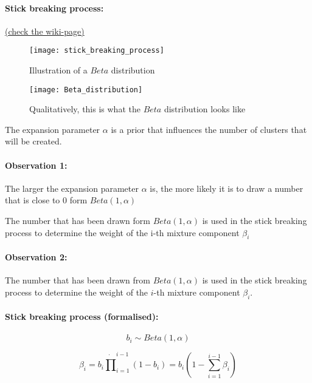 \paragraph{Stick breaking process:} \href{https://en.wikipedia.org/wiki/Dirichlet_process#The_stick-breaking_process}{(check the wiki-page)}
\begin{figure}[H]
  \centering
  \begin{minipage}[b]{0.49\textwidth}
    \texttt{[image: stick\_breaking\_process]}
    \caption{Illustration of a $Beta$ distribution}
  \end{minipage}
  \begin{minipage}[b]{0.49\textwidth}
    \texttt{[image: Beta\_distribution]}
    \caption{Qualitatively, this is what the $Beta$ distribution looks like}
  \end{minipage}
\end{figure}

The expansion parameter $\alpha$ is a prior that influences the number of clusters that will be created.

\paragraph{Observation 1:}
The larger the expansion parameter $\alpha$ is, the more likely it is to draw a number that is close to $0$ form $Beta(1,\alpha)$

The number that has been drawn form $Beta(1,\alpha)$ is used in the stick breaking process to determine the weight of the i-th mixture component $\beta_i$

\paragraph{Observation 2:}
The number that has been drawn from \(Beta(1,\alpha)\) is used in the stick breaking process to determine the weight of the \(i\)-th mixture component \(\beta_i\).

\paragraph{Stick breaking process (formalised):}

\begin{equation*}
	b_i \sim Beta(1,\alpha)
\end{equation*}

\begin{equation*}
	\beta_i = b_i \dot \prod_{i=1}^{i-1}(1-b_i) = b_i (1 - \sum_{i=1}^{i-1} \beta_i)
\end{equation*}

